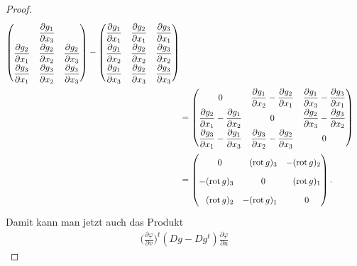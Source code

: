 \begin{proof}
\begin{align*}
\begin{pmatrix}
		&\displaystyle \frac{\partial g_1}{\partial x_3}
\\
\displaystyle \frac{\partial g_2}{\partial x_1}
	&\displaystyle \frac{\partial g_2}{\partial x_2}
		&\displaystyle \frac{\partial g_2}{\partial x_3}
\\
\displaystyle \frac{\partial g_3}{\partial x_1}
	&\displaystyle \frac{\partial g_3}{\partial x_2}
		&\displaystyle \frac{\partial g_3}{\partial x_3}
\end{pmatrix}
-
\begin{pmatrix}
\displaystyle\frac{\partial g_1}{\partial x_1}
	&\displaystyle\frac{\partial g_2}{\partial x_1}
		&\displaystyle\frac{\partial g_3}{\partial x_1}
\\
\displaystyle\frac{\partial g_1}{\partial x_2}
	&\displaystyle\frac{\partial g_2}{\partial x_2}
		&\displaystyle\frac{\partial g_3}{\partial x_2}
\\
\displaystyle\frac{\partial g_1}{\partial x_3}
	&\displaystyle\frac{\partial g_2}{\partial x_3}
		&\displaystyle\frac{\partial g_3}{\partial x_3}
\end{pmatrix}
\\
&=
\renewcommand{\arraystretch}{1.8}
\begin{pmatrix}
0
&\displaystyle
\frac{\partial g_1}{\partial x_2}-\frac{\partial g_2}{\partial x_1}
&\displaystyle
\frac{\partial g_1}{\partial x_3}-\frac{\partial g_3}{\partial x_1}
\\
\displaystyle
\frac{\partial g_2}{\partial x_1}-\frac{\partial g_1}{\partial x_2}
&0
&\displaystyle
\frac{\partial g_2}{\partial x_3}-\frac{\partial g_3}{\partial x_2}
\\
\displaystyle
\frac{\partial g_3}{\partial x_1}-\frac{\partial g_1}{\partial x_3}
&\displaystyle
\frac{\partial g_3}{\partial x_2}-\frac{\partial g_2}{\partial x_3}
&0
\end{pmatrix}
\\
&=
\begin{pmatrix}
\phantom{-}0
	&\phantom{-}(\operatorname{rot} g)_3
		&-(\operatorname{rot} g)_2
\\
-(\operatorname{rot}g)_3
	&\phantom{-}0
		&\phantom{-}(\operatorname{rot}g)_1
\\
\phantom{-}(\operatorname{rot}g)_2
	&-(\operatorname{rot}g)_1
		&\phantom{-}0
\end{pmatrix}.
\end{align*}
Damit kann man jetzt auch das Produkt
\begin{align*}
\biggl(\frac{\partial\varphi}{\partial v}\biggr)^t
(
Dg
-
Dg^t
)
\frac{\partial\varphi}{\partial u}

\end{align*}
\end{proof}
